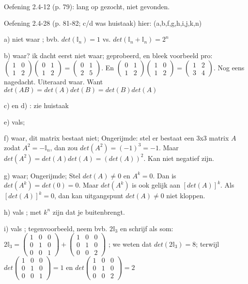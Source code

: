 \documentclass{article}
\begin{document}
Oefening 2.4-12 (p. 79): lang op gezocht, niet gevonden. 

Oefening 2.4-28 (p. 81-82; c/d was huistaak) 
hier: (a,b,f,g,h,i,j,k,n)

a) niet waar ; bvb. $det(\mathbb{I}_n)=1$ vs. $det(\mathbb{I}_n + \mathbb{I}_n) = 2^n$

b) waar? ik dacht eerst niet waar; geprobeerd, en bleek voorbeeld pro: 
$\begin{pmatrix}1 & 0 \\1 & 2 \end{pmatrix} \begin{pmatrix}0 & 1 \\1 & 2 \end{pmatrix} = \begin{pmatrix}0 & 1 \\2 & 5 \end{pmatrix}$. En $ \begin{pmatrix}0 & 1 \\1 & 2 \end{pmatrix} \begin{pmatrix}1 & 0 \\1 & 2 \end{pmatrix} = \begin{pmatrix}1 & 2 \\3 & 4 \end{pmatrix}$.  Nog eens nagedacht. Uiteraard waar. Want $det(AB)=det(A) det(B) = det(B)  det(A)$

c) en d) : zie huistaak 

e) vals; 

f)  waar, dit matrix bestaat niet; Ongerijmde: stel er bestaat een 3x3 matrix $A$ zodat $A^2=-\mathbb{I}_n$, dan zou $det(A^2) = (-1)^3 = -1$. Maar $det(A^2) = det(A)det(A) = (det(A))^2$. Kan niet negatief zijn. 

g) waar; Ongerijmde; Stel $det(A) \neq 0$ en $A^k=0$. Dan is $det(A^k)=det(0)=0$. Maar $det(A^k)$ is ook gelijk aan $[det(A)]^k$. Als $[det(A)]^k =0$, dan kan uitgangspunt $det(A) \neq 0$ niet kloppen. 

h) vals ; met $k^n$ zijn dat je buitenbrengt. 

i) vals ; tegenvoorbeeld, neem bvb. $2\mathbb{I}_3$ en schrijf als som: $2\mathbb{I}_3 = \begin{pmatrix}1 & 0 &0\\0 & 1& 0\\0&0&1 \end{pmatrix} + \begin{pmatrix}1 & 0 &0\\0 & 1&0\\0&0&2 \end{pmatrix}$ ; we weten dat $det(2\mathbb{I}_3) = 8$; terwijl $det\begin{pmatrix}1 & 0 &0\\0 & 1& 0\\0&0&1 \end{pmatrix} = 1$ en $det\begin{pmatrix}1 & 0 &0\\0 & 1&0\\0&0&2 \end{pmatrix} = 2$
\end{document}

